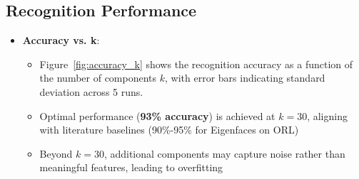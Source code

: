 \documentclass{article}
\begin{document}
	\subsection{Recognition Performance}
	\begin{itemize}
		\item \textbf{Accuracy vs. k}:
		\begin{itemize}
			\item Figure~\ref{fig:accuracy_k} shows the recognition accuracy as a function of the number of components \(k\), with error bars indicating standard deviation across 5 runs.
			\item Optimal performance (\textbf{93\% accuracy}) is achieved at \(k=30\), aligning with literature baselines (90\%-95\% for Eigenfaces on ORL)
			\item Beyond \(k=30\), additional components may capture noise rather than meaningful features, leading to overfitting
		\end{itemize}
		

\end{itemize}
\end{document}
